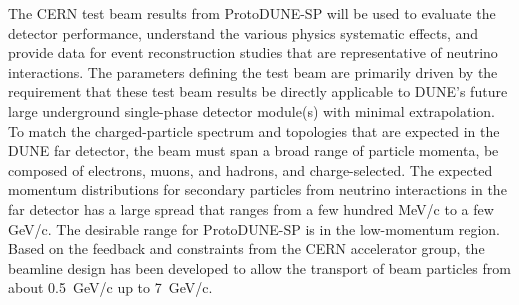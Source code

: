 The CERN test beam results from ProtoDUNE-SP will be used to evaluate the detector performance,  understand the various physics systematic effects, and provide data for event reconstruction studies that are representative of neutrino interactions. 
The parameters defining the test beam are primarily driven by the requirement that these test beam results be directly applicable to DUNE's future large underground single-phase detector module(s) with minimal extrapolation.
To match the charged-particle spectrum and topologies that are expected in the DUNE far detector, the beam must span a broad range of particle momenta, be composed of electrons, muons, and hadrons, and charge-selected. 
The expected momentum distributions for secondary particles from neutrino interactions in the far detector has a large spread that ranges from a few hundred MeV/c to a few GeV/c.
The desirable range for ProtoDUNE-SP is in the low-momentum region. Based on the feedback and constraints from the CERN accelerator group, the beamline design has been developed to allow the transport of beam particles from about 0.5~GeV/c up to 7~GeV/c. 

